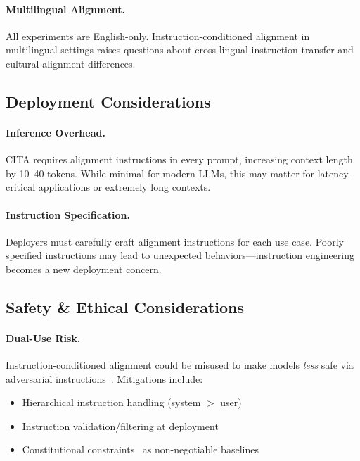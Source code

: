 \paragraph{Multilingual Alignment.} All experiments are English-only. Instruction-conditioned alignment in multilingual settings raises questions about cross-lingual instruction transfer and cultural alignment differences.

\vspace{-2mm}
\subsection{Deployment Considerations}
\label{sec:deployment}

\paragraph{Inference Overhead.} CITA requires alignment instructions in every prompt, increasing context length by 10--40 tokens. While minimal for modern LLMs, this may matter for latency-critical applications or extremely long contexts.

\paragraph{Instruction Specification.} Deployers must carefully craft alignment instructions for each use case. Poorly specified instructions may lead to unexpected behaviors---instruction engineering becomes a new deployment concern.

\vspace{-2mm}
\subsection{Safety \& Ethical Considerations}
\label{sec:safety_ethics}

\paragraph{Dual-Use Risk.} Instruction-conditioned alignment could be misused to make models \textit{less} safe via adversarial instructions~\cite{zou2023universal,carlini2023aligned,pace2024west}. Mitigations include:
\begin{itemize}[leftmargin=*,itemsep=1pt]
    \item Hierarchical instruction handling (system $>$ user)
    \item Instruction validation/filtering at deployment
    \item Constitutional constraints~\cite{bai2022constitutional} as non-negotiable baselines
\end{itemize}

